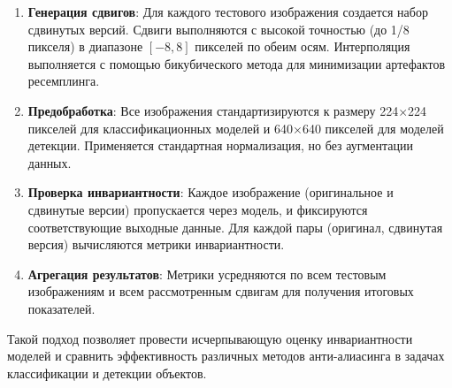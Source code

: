 \begin{enumerate}
    \item \textbf{Генерация сдвигов}: Для каждого тестового изображения создается набор сдвинутых версий. Сдвиги выполняются с высокой точностью (до 1/8 пикселя) в диапазоне $[-8, 8]$ пикселей по обеим осям. Интерполяция выполняется с помощью бикубического метода для минимизации артефактов ресемплинга.
    
    \item \textbf{Предобработка}: Все изображения стандартизируются к размеру 224×224 пикселей для классификационных моделей и 640×640 пикселей для моделей детекции. Применяется стандартная нормализация, но без аугментации данных.
    
    \item \textbf{Проверка инвариантности}: Каждое изображение (оригинальное и сдвинутые версии) пропускается через модель, и фиксируются соответствующие выходные данные. Для каждой пары (оригинал, сдвинутая версия) вычисляются метрики инвариантности.
    
    \item \textbf{Агрегация результатов}: Метрики усредняются по всем тестовым изображениям и всем рассмотренным сдвигам для получения итоговых показателей.
\end{enumerate}

Такой подход позволяет провести исчерпывающую оценку инвариантности моделей и сравнить эффективность различных методов анти-алиасинга в задачах классификации и детекции объектов.

\newpage
